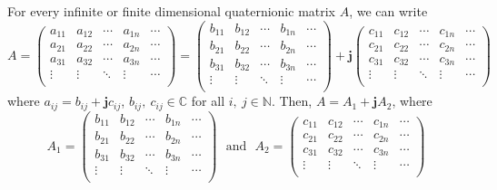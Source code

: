 \documentclass[pdflatex,sn-mathphys-num]{sn-jnl}%
\theoremstyle{thmstyleone}%
\theoremstyle{thmstyletwo}%
\theoremstyle{thmstylethree}%
\theoremstyle{definition}
\theoremstyle{remark}
\begin{document}
For every infinite or finite dimensional quaternionic matrix $A$, we can write
$$
A=
\begin{pmatrix}
    a_{11} & a_{12} & \cdots & a_{1n} & \cdots \\
    a_{21} & a_{22} & \cdots & a_{2n} & \cdots \\
    a_{31} & a_{32} & \cdots & a_{3n} & \cdots \\
    \vdots & \vdots & \ddots & \vdots & \cdots \\
\end{pmatrix}
=\begin{pmatrix}
    b_{11} & b_{12} & \cdots & b_{1n} & \cdots \\
    b_{21} & b_{22} & \cdots & b_{2n} & \cdots \\
    b_{31} & b_{32} & \cdots & b_{3n} & \cdots \\
    \vdots & \vdots & \ddots & \vdots & \cdots \\
\end{pmatrix}
+\boldsymbol{j}
\begin{pmatrix}
    c_{11} & c_{12} & \cdots & c_{1n} & \cdots \\
    c_{21} & c_{22} & \cdots & c_{2n} & \cdots \\
    c_{31} & c_{32} & \cdots & c_{3n} & \cdots \\
    \vdots & \vdots & \ddots & \vdots & \cdots \\
\end{pmatrix}
$$
where $a_{ij}=b_{ij}+\boldsymbol{j}c_{ij}$, $b_{ij},\ c_{ij}\in\mathbb{C}$ for all $i,\ j\in\mathbb{N}$. Then, $A=A_1+\boldsymbol{j}A_2$, where
\[A_1=\begin{pmatrix}
    b_{11} & b_{12} & \cdots & b_{1n} & \cdots \\
    b_{21} & b_{22} & \cdots & b_{2n} & \cdots \\
    b_{31} & b_{32} & \cdots & b_{3n} & \cdots \\
    \vdots & \vdots & \ddots & \vdots & \cdots \\
\end{pmatrix}
\ \ \ \text{and} \ \ \ A_2=\begin{pmatrix}
    c_{11} & c_{12} & \cdots & c_{1n} & \cdots \\
    c_{21} & c_{22} & \cdots & c_{2n} & \cdots \\
    c_{31} & c_{32} & \cdots & c_{3n} & \cdots \\
    \vdots & \vdots & \ddots & \vdots & \cdots \\
\end{pmatrix}
\]
\end{document}
